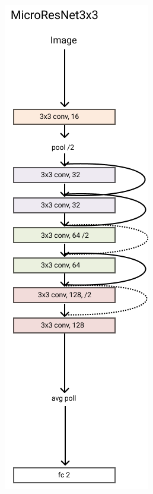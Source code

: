 \documentclass[../document.tex]{subfiles}
\begin{document}
\begin{figure}[htbp]
\begin{subfigure}[b]{0.22\textwidth}
        \includegraphics[width=\textwidth]{../img/3/models/transparent-microresnet3x3.png}

\end{subfigure}
\end{figure}
\end{document}
